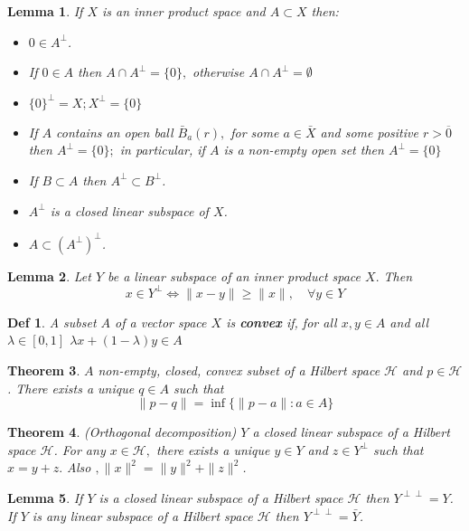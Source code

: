 \documentclass[10pt]{paper}
\newtheorem{theorem}{Theorem}[section]
\newtheorem{definition}{Def}[section]
\newtheorem{lemma}[theorem]{Lemma}
\begin{document}
\begin{lemma}
    If $X$ is an inner product space and $A \subset X$ then:
    \begin{itemize}
        \item $0 \in A^{\perp}$.
        \item If $0 \in A$ then $A \cap A^{\perp}=\{0\},$ otherwise $A \cap A^{\perp}=\emptyset$
        \item $\{0\}^{\perp}=X ; X^{\perp}=\{0\}$
        \item If $A$ contains an open ball $\bar{B}_{a}(r),$ for some $a \in \bar{X}$ and some positive $r>\overline{0}$ then $A^{\perp}=\{0\} ;$ in particular, if $A$ is a non-empty open set then $A^{\perp}=\{0\}$
        \item If $B \subset A$ then $A^{\perp} \subset B^{\perp}$.
        \item $A^{\perp}$ is a closed linear subspace of $X$.
        \item $A \subset\left(A^{\perp}\right)^{\perp}$.
    \end{itemize}
\end{lemma}

\begin{lemma}
    Let $Y$ be a linear subspace of an inner product space $X .$ Then
    $$
        x \in Y^{\perp} \Longleftrightarrow\|x-y\| \geq\|x\|, \quad \forall y \in Y
    $$
\end{lemma}

\begin{definition}
    A subset $A$ of a vector space $X$ is \textbf{convex} if, for all $x, y \in A$ and all $\lambda \in[0,1]$ $\lambda x+(1-\lambda) y \in A$
\end{definition}

\begin{theorem}
    $A$ non-empty, closed, convex subset of a Hilbert space $\mathcal{H}$ and $p \in \mathcal{H}$. There exists a unique $q \in A$ such that
    $$
        \|p-q\|=\inf \{\|p-a\|: a \in A\}
    $$
\end{theorem}

\begin{theorem}(Orthogonal decomposition)
    $Y$ a closed linear subspace of a Hilbert space $\mathcal{H}$. For any $x \in \mathcal{H},$ there exists a unique $y \in Y$ and $z \in Y^{\perp}$ such that $x=y+z .$ Also $,\|x\|^{2}=\|y\|^{2}+\|z\|^{2}$.
\end{theorem}

\begin{lemma}
    If $Y$ is a closed linear subspace of a Hilbert space $\mathcal{H}$ then $Y^{\perp \perp}=Y$. If $Y$ is any linear subspace of a Hilbert space $\mathcal{H}$ then $Y^{\perp \perp}=\bar{Y}$.
\end{lemma}
\end{document}
